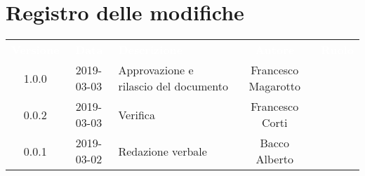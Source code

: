\section*{Registro delle modifiche}
{
	\renewcommand{\arraystretch}{1.5}
	\centering
	\begin{longtable}{ c c  C{4cm}  c  c }
		
		\textcolor{white}{\textbf{Versione}} & \textcolor{white}{\textbf{Data}} & \textcolor{white}{\textbf{Descrizione}} & \textcolor{white}{\textbf{Autore}} & \textcolor{white}{\textbf{Ruolo}}\\
		1.0.0 & 2019-03-03 & Approvazione e rilascio del documento & Francesco Magarotto & \Res{}\\
		0.0.2 & 2019-03-03 & Verifica & Francesco Corti & \ver{}\\
		0.0.1 & 2019-03-02 & Redazione verbale & Bacco Alberto & \reda{}\\
		
		
	\end{longtable}
	
}